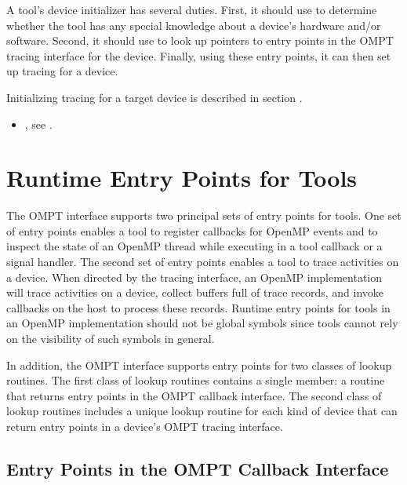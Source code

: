 \effect

A tool's device initializer has several duties.  First, it should use
 to determine whether the tool has any special knowledge
about a device's hardware and/or software.  Second, it should use
 to look up pointers to entry points in the OMPT tracing
interface for the device.  Finally, using these entry points, it can
then set up tracing for a device.

Initializing tracing for a target device is described in section
. 

\crossreferences
\begin{itemize}
\item {}, see
  .
\end{itemize}

\section{Runtime Entry Points for Tools}
\label{sec:entry-points}

The OMPT interface supports two principal sets of entry points for tools. One
set of entry points enables a tool to register callbacks for OpenMP
events and to inspect the state of an OpenMP thread while
executing in a tool callback or a signal handler. The second set of entry points enables a
tool to trace activities on a device. When directed by the tracing
interface, an OpenMP implementation will trace activities on a device, collect
buffers full of trace records, and invoke callbacks on the host to
process these records. 
Runtime entry points for tools in an OpenMP implementation
should not be global symbols since tools cannot rely on the visibility
of such symbols in general.

In addition, the OMPT interface supports
entry points for two classes of lookup routines. The first
class of lookup routines contains a single member: a
routine that returns entry points in the OMPT callback interface. 
The second class of lookup routines includes 
a unique lookup routine for each kind of
device that can return entry points in a device's OMPT tracing interface.

\subsection{Entry Points in the OMPT Callback Interface}
\label{sec:ompt-callback-entry-points}

